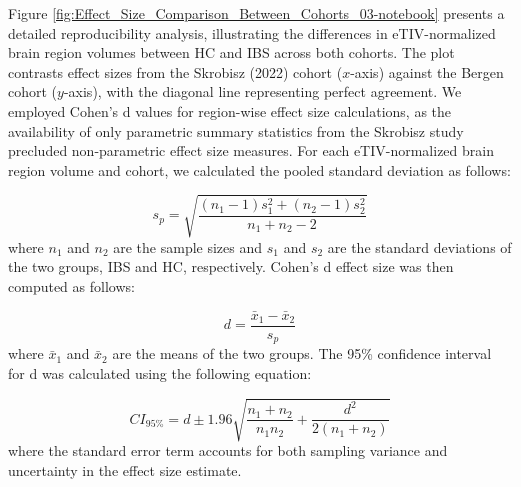 \documentclass[diagnostics,article,accept,pdftex,moreauthors]{Definitions/mdpi}
\begin{document}
Figure \ref{fig:Effect_Size_Comparison_Between_Cohorts_03-notebook} presents a detailed reproducibility analysis, illustrating the differences in eTIV-normalized brain region volumes between HC and IBS across both cohorts. The plot contrasts effect sizes from the Skrobisz (2022) cohort ($x$-axis) against the Bergen cohort ($y$-axis), with the diagonal line representing perfect agreement. We employed Cohen's d values for region-wise effect size calculations, as the availability of only parametric summary statistics from the Skrobisz study precluded non-parametric effect size measures. For each eTIV-normalized brain region volume and cohort, we calculated the pooled standard deviation as follows:


\begin{equation*}
s_p = \sqrt{\frac{(n_1-1)s_1^2 + (n_2-1)s_2^2}{n_1+n_2-2}}
\end{equation*}
where $n_1$ and $n_2$ are the sample sizes and $s_1$ and $s_2$ are the standard deviations of the two groups, IBS and HC, respectively. Cohen's d effect size was then computed as follows:

\begin{equation*}
d = \frac{\bar{x}_1 - \bar{x}_2}{s_p}
\end{equation*}
where $\bar{x}_1$ and $\bar{x}_2$ are the means of the two groups. The 95\% confidence interval for d was calculated using the following equation:

\begin{equation*}
CI_{95\%} = d \pm 1.96\sqrt{\frac{n_1+n_2}{n_1n_2} + \frac{d^2}{2(n_1+n_2)}}
\end{equation*}
where the standard error term accounts for both sampling variance and uncertainty in the effect size estimate.



\vspace{-6pt}
\end{document}
